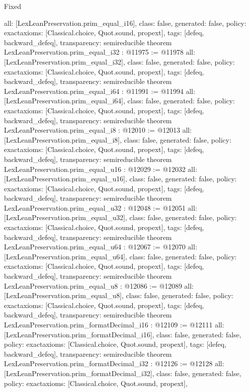 \begin{lexlean}{Fixed}
\begin{coremodule}
{  all: [LexLeanPreservation.prim_equal_i16],
  class: false,
  generated: false,
  policy: exact{axioms: [Classical.choice, Quot.sound, propext]},
  tags: [defeq, backward_defeq],
  transparency: semireducible
}
theorem LexLeanPreservation.prim_equal_i32 : @11975 := @11978 {
  all: [LexLeanPreservation.prim_equal_i32],
  class: false,
  generated: false,
  policy: exact{axioms: [Classical.choice, Quot.sound, propext]},
  tags: [defeq, backward_defeq],
  transparency: semireducible
}
theorem LexLeanPreservation.prim_equal_i64 : @11991 := @11994 {
  all: [LexLeanPreservation.prim_equal_i64],
  class: false,
  generated: false,
  policy: exact{axioms: [Classical.choice, Quot.sound, propext]},
  tags: [defeq, backward_defeq],
  transparency: semireducible
}
theorem LexLeanPreservation.prim_equal_i8 : @12010 := @12013 {
  all: [LexLeanPreservation.prim_equal_i8],
  class: false,
  generated: false,
  policy: exact{axioms: [Classical.choice, Quot.sound, propext]},
  tags: [defeq, backward_defeq],
  transparency: semireducible
}
theorem LexLeanPreservation.prim_equal_u16 : @12029 := @12032 {
  all: [LexLeanPreservation.prim_equal_u16],
  class: false,
  generated: false,
  policy: exact{axioms: [Classical.choice, Quot.sound, propext]},
  tags: [defeq, backward_defeq],
  transparency: semireducible
}
theorem LexLeanPreservation.prim_equal_u32 : @12048 := @12051 {
  all: [LexLeanPreservation.prim_equal_u32],
  class: false,
  generated: false,
  policy: exact{axioms: [Classical.choice, Quot.sound, propext]},
  tags: [defeq, backward_defeq],
  transparency: semireducible
}
theorem LexLeanPreservation.prim_equal_u64 : @12067 := @12070 {
  all: [LexLeanPreservation.prim_equal_u64],
  class: false,
  generated: false,
  policy: exact{axioms: [Classical.choice, Quot.sound, propext]},
  tags: [defeq, backward_defeq],
  transparency: semireducible
}
theorem LexLeanPreservation.prim_equal_u8 : @12086 := @12089 {
  all: [LexLeanPreservation.prim_equal_u8],
  class: false,
  generated: false,
  policy: exact{axioms: [Classical.choice, Quot.sound, propext]},
  tags: [defeq, backward_defeq],
  transparency: semireducible
}
theorem LexLeanPreservation.prim_formatDecimal_i16 : @12109 := @12111 {
  all: [LexLeanPreservation.prim_formatDecimal_i16],
  class: false,
  generated: false,
  policy: exact{axioms: [Classical.choice, Quot.sound, propext]},
  tags: [defeq, backward_defeq],
  transparency: semireducible
}
theorem LexLeanPreservation.prim_formatDecimal_i32 : @12126 := @12128 {
  all: [LexLeanPreservation.prim_formatDecimal_i32],
  class: false,
  generated: false,
  policy: exact{axioms: [Classical.choice, Quot.sound, propext]},
}
\end{coremodule}
\end{lexlean}
